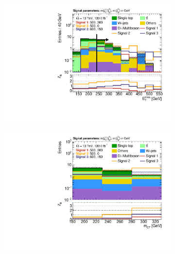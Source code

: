 \begin{figure}
	\centering
	\begin{subfigure}[b]{0.45\linewidth}
		\centering\includegraphics[width=\textwidth]{n1_SRMM_mct_bins/met.pdf}
		\vspace{-2em}
		\caption{\label{fig:Wh_reopt_second_round_n1_srmm_met}}
	\end{subfigure}%
	\begin{subfigure}[b]{0.45\linewidth}
		\centering\includegraphics[width=\textwidth]{n1_SRMM_mct_bins/mct.pdf}
		\vspace{-2em}
		\caption{\label{fig:Wh_reopt_second_round_n1_srmm_mct}}
	\end{subfigure}
	\par\medskip
	\begin{subfigure}[b]{0.45\linewidth}

\end{subfigure}
\end{figure}
